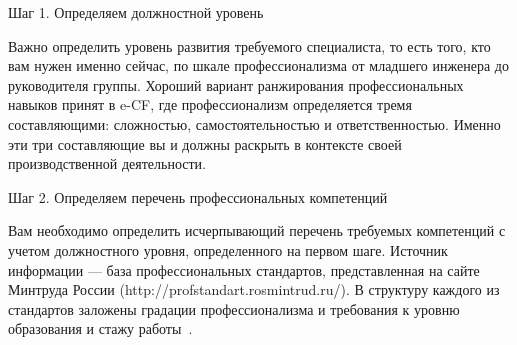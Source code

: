\documentclass{../industrial-development}
\begin{document}
\lecturenotes

\alert{Шаг 1. Определяем должностной уровень}

Важно определить уровень развития требуемого специалиста, то есть того, кто вам нужен именно сейчас, по шкале профессионализма от младшего инженера до руководителя группы. Хороший вариант ранжирования профессиональных навыков принят в e-CF, где профессионализм определяется тремя составляющими: сложностью, самостоятельностью и ответственностью. Именно эти три составляющие вы и должны раскрыть в контексте своей производственной деятельности.

\alert{Шаг 2. Определяем перечень профессиональных компетенций}

Вам необходимо определить исчерпывающий перечень требуемых компетенций с учетом должностного уровня, определенного на первом шаге. Источник информации — база профессиональных стандартов, представленная на сайте Минтруда России (http://profstandart.rosmintrud.ru/). В структуру каждого из стандартов заложены градации профессионализма и требования к уровню образования и стажу работы~\cite[с.~280]{Pererva}.
\end{document}
